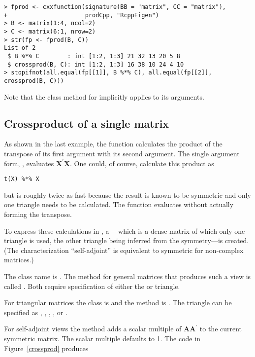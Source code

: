 \documentclass[shortnames,article,nojss]{jss}
\begin{document}
\begin{verbatim}
> fprod <- cxxfunction(signature(BB = "matrix", CC = "matrix"), 
+                      prodCpp, "RcppEigen")
> B <- matrix(1:4, ncol=2)
> C <- matrix(6:1, nrow=2)
> str(fp <- fprod(B, C))
List of 2
 $ B %*% C        : int [1:2, 1:3] 21 32 13 20 5 8
 $ crossprod(B, C): int [1:2, 1:3] 16 38 10 24 4 10
> stopifnot(all.equal(fp[[1]], B %*% C), all.equal(fp[[2]], crossprod(B, C)))
\end{verbatim}
Note that the  class method for 
implicitly applies  to its arguments.

\subsection{Crossproduct of a single matrix}
\label{sec:crossproduct}

As shown in the last example, the  function
 calculates the product of the transpose of its first
argument with its second argument.  The single argument form,
, evaluates $\bm X^\prime\bm X$.  One could, of
course, calculate this product as
\begin{verbatim}
t(X) %*% X
\end{verbatim}
but  is roughly twice as fast because the result is
known to be symmetric and only one triangle needs to be calculated.
The function  evaluates 
without actually forming the transpose.

To express these calculations in , a
---which is a dense matrix of which only one
triangle is used, the other triangle being inferred from the
symmetry---is created.  (The characterization ``self-adjoint'' is
equivalent to symmetric for non-complex matrices.)

The  class name is .  The method for
general matrices that produces such a view is called
.  Both require specification of either the
 or  triangle.

For triangular matrices the class is  and the
method is .  The triangle can be specified as
, , , ,
 or .

For self-adjoint views the  method adds a scalar multiple
of $\bm A\bm A^\prime$ to the current symmetric matrix.  The scalar
multiple defaults to 1.  The code in Figure~\ref{crossprod} produces
\end{document}
